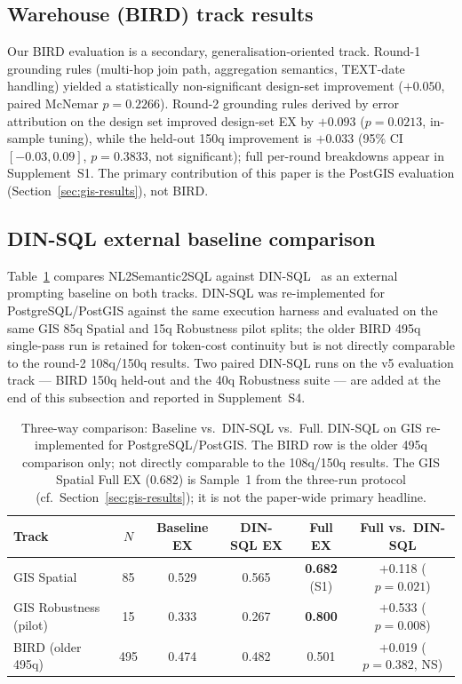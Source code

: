\documentclass[11pt]{article}
\begin{document}
\subsection{Warehouse (BIRD) track results}
\label{sec:bird-results}

Our BIRD evaluation is a secondary, generalisation-oriented track. Round-1 grounding rules (multi-hop join path, aggregation semantics, TEXT-date handling) yielded a statistically non-significant design-set improvement ($+0.050$, paired McNemar $p=0.2266$). Round-2 grounding rules derived by error attribution on the design set improved design-set EX by $+0.093$ ($p=0.0213$, in-sample tuning), while the held-out 150q improvement is $+0.033$ (95\% CI $[-0.03, 0.09]$, $p=0.3833$, not significant); full per-round breakdowns appear in Supplement~S1. The primary contribution of this paper is the PostGIS evaluation (Section~\ref{sec:gis-results}), not BIRD.

\subsection{DIN-SQL external baseline comparison}
\label{sec:dinsql}

Table~\ref{tab:dinsql} compares NL2Semantic2SQL against DIN-SQL~\citep{pourreza2023dinsql} as an external prompting baseline on both tracks. DIN-SQL was re-implemented for PostgreSQL/PostGIS against the same execution harness and evaluated on the same GIS 85q Spatial and 15q Robustness pilot splits; the older BIRD 495q single-pass run is retained for token-cost continuity but is not directly comparable to the round-2 108q/150q results. Two paired DIN-SQL runs on the v5 evaluation track --- BIRD 150q held-out and the 40q Robustness suite --- are added at the end of this subsection and reported in Supplement~S4.

\begin{table}[t]
\centering\small
\caption{Three-way comparison: Baseline vs.\ DIN-SQL vs.\ Full. DIN-SQL on GIS re-implemented for PostgreSQL/PostGIS. The BIRD row is the older 495q comparison only; not directly comparable to the 108q/150q results. The GIS Spatial Full EX ($0.682$) is Sample~1 from the three-run protocol (cf.\ Section~\ref{sec:gis-results}); it is not the paper-wide primary headline.}
\label{tab:dinsql}
{\setlength{\tabcolsep}{5pt}
\begin{tabular}{lccccc}
\toprule
Track & $N$ & Baseline EX & DIN-SQL EX & Full EX & Full vs.\ DIN-SQL \\
\midrule
GIS Spatial        & 85  & 0.529 & 0.565 & \textbf{0.682} (S1) & $+$0.118 ($p=0.021$) \\
GIS Robustness (pilot) & 15  & 0.333 & 0.267 & \textbf{0.800} & $+$0.533 ($p=0.008$) \\
BIRD (older 495q)  & 495 & 0.474 & 0.482 & 0.501 & $+$0.019 ($p=0.382$, NS) \\
\bottomrule
\end{tabular}
}
\end{table}
\end{document}
